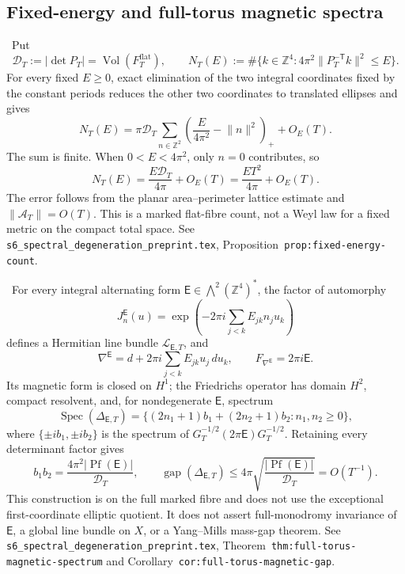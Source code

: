 \subsection{Fixed-energy and full-torus magnetic spectra}

\begin{auditrecord}
\Verified\ Put
\[
 \mathcal D_T:=|\det P_T|=\operatorname{Vol}(F_T^{\mathrm{flat}}),
 \qquad
 N_T(E):=\#\{k\in\mathbb Z^4:
 4\pi^2\lVert P_T^{-\mathsf T}k\rVert^2\leq E\}.
\]
For every fixed \(E\geq0\), exact elimination of the two integral
coordinates fixed by the constant periods reduces the other two coordinates
to translated ellipses and gives
\[
 N_T(E)=\pi\mathcal D_T
 \sum_{n\in\mathbb Z^2}
 \left(\frac{E}{4\pi^2}-\lVert n\rVert^2\right)_+
 +O_E(T).
\]
The sum is finite.  When \(0<E<4\pi^2\), only \(n=0\) contributes, so
\[
 N_T(E)=\frac{E\mathcal D_T}{4\pi}+O_E(T)
       =\frac{ET^2}{4\pi}+O_E(T).
\]
The error follows from the planar area--perimeter lattice estimate and
\(\lVert\mathcal A_T\rVert=O(T)\).  This is a marked flat-fibre count, not
a Weyl law for a fixed metric on the compact total space.  See
\texttt{s6\_spectral\_degeneration\_preprint.tex},
Proposition~\texttt{prop:fixed-energy-count}.
\end{auditrecord}

\begin{auditrecord}
\Verified\ For every integral alternating form
\(\mathsf E\in\bigwedge^2(\mathbb Z^4)^*\), the factor of automorphy
\[
 J_n^{\mathsf E}(u)=
 \exp\!\left(-2\pi i\sum_{j<k}E_{jk}n_ju_k\right)
\]
defines a Hermitian line bundle \(\mathcal L_{\mathsf E,T}\), and
\[
 \nabla^{\mathsf E}=d+2\pi i\sum_{j<k}E_{jk}u_j\,du_k,
 \qquad F_{\nabla^{\mathsf E}}=2\pi i\mathsf E.
\]
Its magnetic form is closed on \(H^1\); the Friedrichs operator has domain
\(H^2\), compact resolvent, and, for nondegenerate \(\mathsf E\), spectrum
\[
 \operatorname{Spec}(\Delta_{\mathsf E,T})
 =\{(2n_1+1)b_1+(2n_2+1)b_2:n_1,n_2\geq0\},
\]
where \(\{\pm ib_1,\pm ib_2\}\) is the spectrum of
\(G_T^{-1/2}(2\pi\mathsf E)G_T^{-1/2}\).  Retaining every determinant
factor gives
\[
 b_1b_2=\frac{4\pi^2|\operatorname{Pf}(\mathsf E)|}{\mathcal D_T},
 \qquad
 \operatorname{gap}(\Delta_{\mathsf E,T})
 \leq4\pi\sqrt{\frac{|\operatorname{Pf}(\mathsf E)|}{\mathcal D_T}}
 =O(T^{-1}).
\]
This construction is on the full marked fibre and does not use the
exceptional first-coordinate elliptic quotient.  It does not assert
full-monodromy invariance of \(\mathsf E\), a global line bundle on \(X\),
or a Yang--Mills mass-gap theorem.  See
\texttt{s6\_spectral\_degeneration\_preprint.tex},
Theorem~\texttt{thm:full-torus-magnetic-spectrum} and
Corollary~\texttt{cor:full-torus-magnetic-gap}.
\end{auditrecord}

